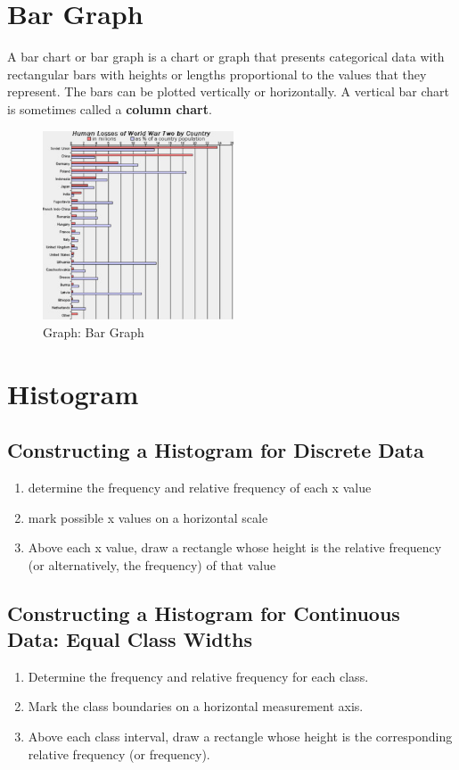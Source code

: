 \section{Bar Graph \cite{wiki-bar-chart}}\label{graph_bar}
A bar chart or bar graph is a chart or graph that presents categorical data with rectangular bars with heights or lengths proportional to the values that they represent. The bars can be plotted vertically or horizontally. A vertical bar chart is sometimes called a \textbf{column chart}.

\vspace{-1cm}

\begin{center}
    \begin{figure}
        \centering
        \includegraphics[height=5.6cm]{Pictures/data/data_graph_bar.jpg}
        \caption{Graph: Bar Graph}
    \end{figure}
\end{center}


\section{Histogram \cite{ism-2, wiki-histogram}}\label{histogram}
\subsection{Constructing a Histogram for Discrete Data}
\begin{enumerate}
    \item determine the frequency and relative frequency of each x value
    \item mark possible x values on a horizontal scale
    \item Above each x value, draw a rectangle whose height is the relative frequency (or alternatively, the frequency) of that value
\end{enumerate}

\subsection{Constructing a Histogram for Continuous Data: Equal Class Widths}
\begin{enumerate}
    \item Determine the frequency and relative frequency for each class.
    \item Mark the class boundaries on a horizontal measurement axis.
    \item Above each class interval, draw a rectangle whose height is the corresponding relative frequency (or frequency).
\end{enumerate}

